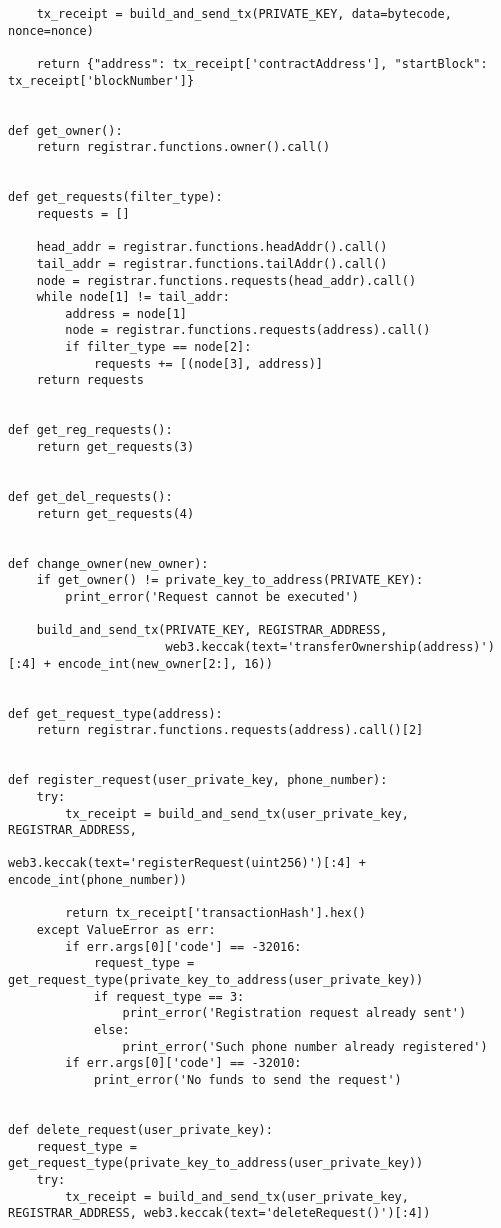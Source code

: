 \begin{verbatim}
    tx_receipt = build_and_send_tx(PRIVATE_KEY, data=bytecode, nonce=nonce)

    return {"address": tx_receipt['contractAddress'], "startBlock": tx_receipt['blockNumber']}


def get_owner():
    return registrar.functions.owner().call()


def get_requests(filter_type):
    requests = []

    head_addr = registrar.functions.headAddr().call()
    tail_addr = registrar.functions.tailAddr().call()
    node = registrar.functions.requests(head_addr).call()
    while node[1] != tail_addr:
        address = node[1]
        node = registrar.functions.requests(address).call()
        if filter_type == node[2]:
            requests += [(node[3], address)]
    return requests


def get_reg_requests():
    return get_requests(3)


def get_del_requests():
    return get_requests(4)


def change_owner(new_owner):
    if get_owner() != private_key_to_address(PRIVATE_KEY):
        print_error('Request cannot be executed')

    build_and_send_tx(PRIVATE_KEY, REGISTRAR_ADDRESS,
                      web3.keccak(text='transferOwnership(address)')[:4] + encode_int(new_owner[2:], 16))


def get_request_type(address):
    return registrar.functions.requests(address).call()[2]


def register_request(user_private_key, phone_number):
    try:
        tx_receipt = build_and_send_tx(user_private_key, REGISTRAR_ADDRESS,
                                       web3.keccak(text='registerRequest(uint256)')[:4] + encode_int(phone_number))

        return tx_receipt['transactionHash'].hex()
    except ValueError as err:
        if err.args[0]['code'] == -32016:
            request_type = get_request_type(private_key_to_address(user_private_key))
            if request_type == 3:
                print_error('Registration request already sent')
            else:
                print_error('Such phone number already registered')
        if err.args[0]['code'] == -32010:
            print_error('No funds to send the request')


def delete_request(user_private_key):
    request_type = get_request_type(private_key_to_address(user_private_key))
    try:
        tx_receipt = build_and_send_tx(user_private_key, REGISTRAR_ADDRESS, web3.keccak(text='deleteRequest()')[:4])


\end{verbatim}
